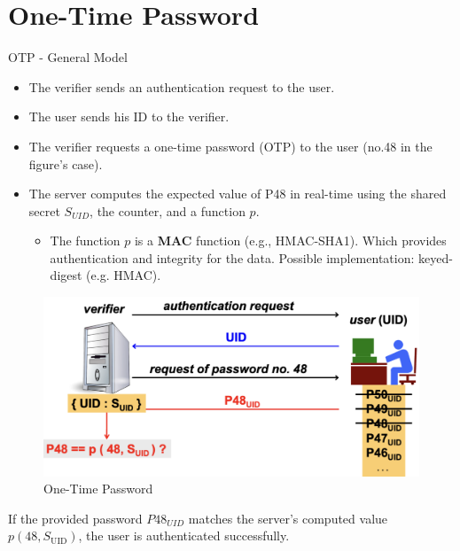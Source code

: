 \section{One-Time Password}
\begin{center}
    OTP - General Model
\end{center}
\begin{multicols}{2}

    \begin{itemize}
        \item The verifier sends an authentication request to the user.
        \item The user sends his ID to the verifier.
        \item The verifier requests a one-time password (OTP) to the user (no.48 in the figure's case).
        \item The server computes the expected value of P48 in real-time using the shared secret $S_{UID}$, the counter, and a function $p$.
        
        \begin{itemize}
            \item The function $p$ is a \textbf{MAC} function (e.g., HMAC-SHA1). Which provides authentication and integrity for the data. Possible implementation: keyed-digest (e.g. HMAC).
        \end{itemize} 
    \end{itemize}

    \columnbreak

    \begin{figure}[H]
        \centering
        \includegraphics[width=\linewidth]{Images/Authentication/OTP.png}
        \caption{One-Time Password}
    \end{figure}
    
\end{multicols}
If the provided password  $P48_{UID}$  matches the server's computed value  $p(48, S_{\text{UID}})$, the user is authenticated successfully.

